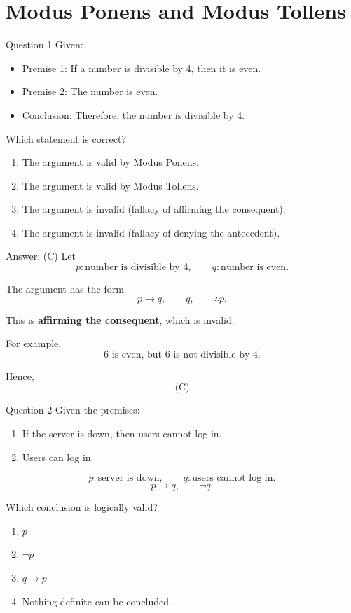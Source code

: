 \documentclass[aspectratio=169,11pt]{beamer}
\begin{document}
\section{Modus Ponens and Modus Tollens}
\begin{frame}{Question 1}
Given:

\begin{itemize}
    \item Premise 1: If a number is divisible by 4, then it is even.
    \item Premise 2: The number is even.
    \item Conclusion: Therefore, the number is divisible by 4.
\end{itemize}

Which statement is correct?

\begin{enumerate}
    \item[(A)] The argument is valid by Modus Ponens.
    \item[(B)] The argument is valid by Modus Tollens.
    \item[(C)] The argument is invalid (fallacy of affirming the consequent).
    \item[(D)] The argument is invalid (fallacy of denying the antecedent).
\end{enumerate}
\end{frame}

\begin{frame}
\begin{block}{Answer: (C)}
Let
$$
p:\text{number is divisible by 4},\qquad
q:\text{number is even}.
$$

The argument has the form
$$
p\to q,\qquad q,\qquad\therefore p.
$$

This is \textbf{affirming the consequent}, which is invalid.

For example,
$$
6\text{ is even, but }6\text{ is not divisible by }4.
$$

Hence,
$$
\boxed{\text{(C)}}
$$
\end{block}
\end{frame}
\begin{frame}{Question 2}
Given the premises:

\begin{enumerate}
    \item If the server is down, then users cannot log in.
    \item Users can log in.
\end{enumerate}
$$
p:\text{server is down},\qquad
q:\text{users cannot log in}.
$$
$$
p\to q,\qquad \neg q.
$$

Which conclusion is logically valid?

\begin{enumerate}
    \item[(A)] $p$
    \item[(B)] $\neg p$
    \item[(C)] $q\to p$
    \item[(D)] Nothing definite can be concluded.
\end{enumerate}
\end{frame}
\end{document}
